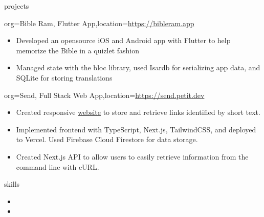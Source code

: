 \documentclass{resume}
\begin{document}
\begin{ResumeSection}{projects}
    \begin{ResumeProject}{org={Bible Ram, Flutter
        App},location={\href{https://bibleram.app}{https://bibleram.app}}}
        \begin{itemize}
            \item {Developed an opensource iOS and Android app with Flutter to help memorize the Bible in a quizlet
                fashion} 
            \item {Managed state with the bloc library,
                used Isardb for serializing app data, and SQLite for storing
            translations}
        \end{itemize}
    \end{ResumeProject}
    \begin{ResumeProject}{org={Send, Full Stack Web App},location={\href{https://send.petit.dev}{https://send.petit.dev}}}
        \begin{itemize}
            \item {Created responsive \href{https://send.petit.dev}{website} to store and retrieve links identified by short text.}
            \item {Implemented frontend with TypeScript, Next.js, TailwindCSS, and deployed to Vercel. Used Firebase Cloud Firestore for data storage.}
            \item {Created Next.js API to allow users to easily retrieve information from the command line with cURL.}
        \end{itemize}
    \end{ResumeProject}
\end{ResumeSection}

\begin{ResumeSection}{skills}
        \begin{itemize}
            \item {}
            \item {}
        \end{itemize}
\end{ResumeSection}
\end{document}
